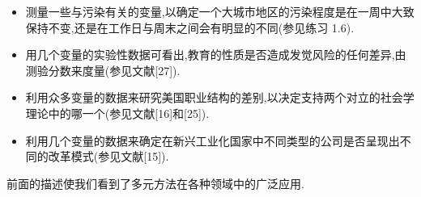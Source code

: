 
\begin{itemize}[leftmargin=*,itemsep=2pt]
\item 测量一些与污染有关的变量,以确定一个大城市地区的污染程度是在一周中大致保持不变,还是在工作日与周末之间会有明显的不同(参见练习 1.6).
\item 用几个变量的实验性数据可看出,教育的性质是否造成发觉风险的任何差异,由测验分数来度量(参见文献[27]).
\item 利用众多变量的数据来研究美国职业结构的差别,以决定支持两个对立的社会学理论中的哪一个(参见文献[16]和[25]).
\item 利用几个变量的数据来确定在新兴工业化国家中不同类型的公司是否呈现出不同的改革模式(参见文献[15]).
\end{itemize}

前面的描述使我们看到了多元方法在各种领域中的广泛应用.
